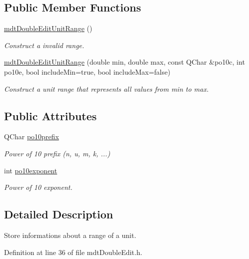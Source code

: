 \subsection*{Public Member Functions}
\begin{DoxyCompactItemize}
\item 
\hyperlink{structmdt_double_edit_unit_range_a98f8a9f96e4fc2878c475e7457302502}{mdt\-Double\-Edit\-Unit\-Range} ()
\begin{DoxyCompactList}\small\item\em Construct a invalid range. \end{DoxyCompactList}\item 
\hyperlink{structmdt_double_edit_unit_range_a5a1a0be20e43effafbdb848080355e9d}{mdt\-Double\-Edit\-Unit\-Range} (double min, double max, const Q\-Char \&po10c, int po10e, bool include\-Min=true, bool include\-Max=false)
\begin{DoxyCompactList}\small\item\em Construct a unit range that represents all values from min to max. \end{DoxyCompactList}\end{DoxyCompactItemize}
\subsection*{Public Attributes}
\begin{DoxyCompactItemize}
\item 
Q\-Char \hyperlink{structmdt_double_edit_unit_range_a81d58c1c153dcb56b203d293622ea82e}{po10prefix}
\begin{DoxyCompactList}\small\item\em Power of 10 prefix (n, u, m, k, ...) \end{DoxyCompactList}\item 
int \hyperlink{structmdt_double_edit_unit_range_abfada8b44a3969939cc2ecda49fbe688}{po10exponent}
\begin{DoxyCompactList}\small\item\em Power of 10 exponent. \end{DoxyCompactList}\end{DoxyCompactItemize}


\subsection{Detailed Description}
Store informations about a range of a unit. 

Definition at line 36 of file mdt\-Double\-Edit.\-h.



